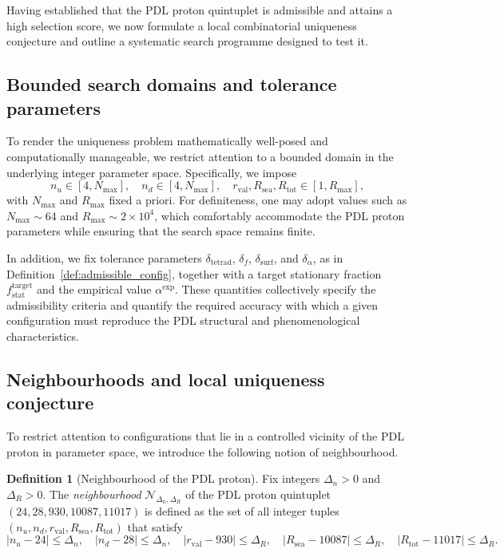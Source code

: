 \documentclass[11pt,a4paper]{article}
\theoremstyle{definition}
\newtheorem{definition}[theorem]{Definition}
\begin{document}
Having established that the PDL proton quintuplet is admissible and attains a high selection score, we now formulate a local combinatorial uniqueness conjecture and outline a systematic search programme designed to test it.\cite{Combinatorial_Proton_v2_2026,PDL_Global_Mapping_2026}

\subsection{Bounded search domains and tolerance parameters}

To render the uniqueness problem mathematically well-posed and computationally manageable, we restrict attention to a bounded domain in the underlying integer parameter space. Specifically, we impose
\[
 n_u \in [4,N_{\max}],\quad
 n_d \in [4,N_{\max}],\quad
 r_{\mathrm{val}},R_{\mathrm{sea}},R_{\mathrm{tot}} \in [1,R_{\max}],
\]
with $N_{\max}$ and $R_{\max}$ fixed a priori. For definiteness, one may adopt values such as $N_{\max}\sim 64$ and $R_{\max}\sim 2\times 10^4$, which comfortably accommodate the PDL proton parameters while ensuring that the search space remains finite.\cite{Combinatorial_Proton_v2_2026}

In addition, we fix tolerance parameters $\delta_{\mathrm{tetrad}}$, $\delta_f$, $\delta_{\mathrm{surf}}$, and $\delta_{\alpha}$, as in Definition~\ref{def:admissible_config}, together with a target stationary fraction $f_{\mathrm{stat}}^{\mathrm{target}}$ and the empirical value $\alpha^{\mathrm{exp}}$. These quantities collectively specify the admissibility criteria and quantify the required accuracy with which a given configuration must reproduce the PDL structural and phenomenological characteristics.\cite{PDL_Global_Mapping_2026}

\subsection{Neighbourhoods and local uniqueness conjecture}

To restrict attention to configurations that lie in a controlled vicinity of the PDL proton in parameter space, we introduce the following notion of neighbourhood.

\begin{definition}[Neighbourhood of the PDL proton]
\label{def:neighbourhood}
Fix integers $\Delta_n>0$ and $\Delta_R>0$. The \emph{neighbourhood} $\mathcal{N}_{\Delta_n,\Delta_R}$ of the PDL proton quintuplet $(24,28,930,10087,11017)$ is defined as the set of all integer tuples $(n_u,n_d,r_{\mathrm{val}},R_{\mathrm{sea}},R_{\mathrm{tot}})$ that satisfy
\[
 |n_u - 24| \leq \Delta_n,\quad
 |n_d - 28| \leq \Delta_n,\quad
 |r_{\mathrm{val}} - 930| \leq \Delta_R,\quad
 |R_{\mathrm{sea}} - 10087| \leq \Delta_R,\quad
 |R_{\mathrm{tot}} - 11017| \leq \Delta_R.
\]
\end{definition}
\end{document}

